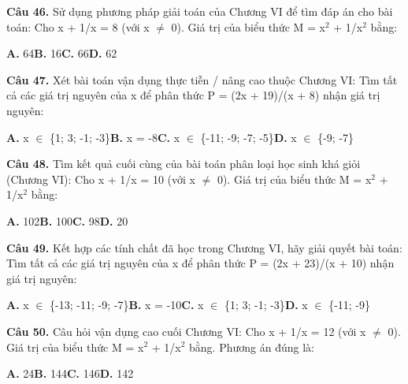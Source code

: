 \documentclass[11pt,a4paper]{article}
\begin{document}
\textbf{\color{primary} Câu 46.} Sử dụng phương pháp giải toán của Chương VI để tìm đáp án cho bài toán: Cho x + 1/x = 8 (với x $\ne$ 0). Giá trị của biểu thức M = x$^2$ + 1/x$^2$ bằng:\par
\hspace*{1.5em}\textbf{A.} 64\quad\quad \textbf{B.} 16\quad\quad \textbf{C.} 66\quad\quad \textbf{D.} 62\par\vspace{2pt}
\textbf{\color{primary} Câu 47.} Xét bài toán vận dụng thực tiễn / nâng cao thuộc Chương VI: Tìm tất cả các giá trị nguyên của x để phân thức P = (2x + 19)/(x + 8) nhận giá trị nguyên:\par
\hspace*{1.5em}\textbf{A.} x $\in$ \{1; 3; -1; -3\}\quad\quad \textbf{B.} x = -8\quad\quad \textbf{C.} x $\in$ \{-11; -9; -7; -5\}\quad\quad \textbf{D.} x $\in$ \{-9; -7\}\par\vspace{2pt}
\textbf{\color{primary} Câu 48.} Tìm kết quả cuối cùng của bài toán phân loại học sinh khá giỏi (Chương VI): Cho x + 1/x = 10 (với x $\ne$ 0). Giá trị của biểu thức M = x$^2$ + 1/x$^2$ bằng:\par
\hspace*{1.5em}\textbf{A.} 102\quad\quad \textbf{B.} 100\quad\quad \textbf{C.} 98\quad\quad \textbf{D.} 20\par\vspace{2pt}
\textbf{\color{primary} Câu 49.} Kết hợp các tính chất đã học trong Chương VI, hãy giải quyết bài toán: Tìm tất cả các giá trị nguyên của x để phân thức P = (2x + 23)/(x + 10) nhận giá trị nguyên:\par
\hspace*{1.5em}\textbf{A.} x $\in$ \{-13; -11; -9; -7\}\quad\quad \textbf{B.} x = -10\quad\quad \textbf{C.} x $\in$ \{1; 3; -1; -3\}\quad\quad \textbf{D.} x $\in$ \{-11; -9\}\par\vspace{2pt}
\textbf{\color{primary} Câu 50.} Câu hỏi vận dụng cao cuối Chương VI: Cho x + 1/x = 12 (với x $\ne$ 0). Giá trị của biểu thức M = x$^2$ + 1/x$^2$ bằng. Phương án đúng là:\par
\hspace*{1.5em}\textbf{A.} 24\quad\quad \textbf{B.} 144\quad\quad \textbf{C.} 146\quad\quad \textbf{D.} 142\par\vspace{2pt}
\end{document}
